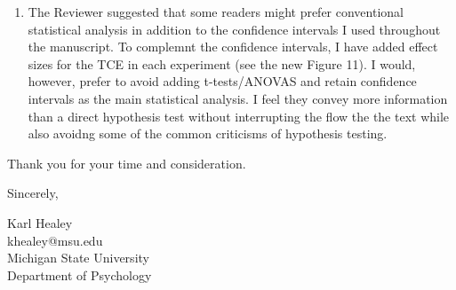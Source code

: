 \documentclass[12pt]{article}
\begin{document}
\begin{enumerate}
	\item
	The Reviewer suggested that some readers might prefer conventional statistical analysis in addition to the confidence intervals I used throughout the manuscript. To complemnt the confidence intervals, I have added effect sizes for the TCE in each experiment (see the new Figure 11). I would, however, prefer to avoid adding t-tests/ANOVAS and retain confidence intervals as the main statistical analysis. I feel they convey more information than a direct hypothesis test without interrupting the flow the the text while also avoidng some of the common criticisms of hypothesis testing.




	

\end{enumerate}



\vspace{20pt}

Thank you for your time and consideration.

\vspace{10pt}

Sincerely,

\vspace{10pt}

Karl Healey\\
khealey@msu.edu\\
Michigan State University\\
Department of Psychology


\end{document}
